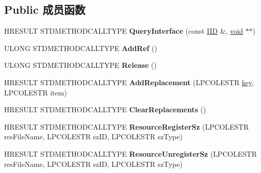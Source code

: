 \subsection*{Public 成员函数}
\begin{DoxyCompactItemize}
\item 
\mbox{\label{class_a_t_l_1_1_c_reg_object_a1d49348a30bd36a8d9355868ca99c03a}} 
H\+R\+E\+S\+U\+LT S\+T\+D\+M\+E\+T\+H\+O\+D\+C\+A\+L\+L\+T\+Y\+PE {\bfseries Query\+Interface} (const \hyperlink{struct___i_i_d}{I\+ID} \&, \hyperlink{interfacevoid}{void} $\ast$$\ast$)
\item 
\mbox{\label{class_a_t_l_1_1_c_reg_object_a1987d123437b59e899ce6d49d314a3f4}} 
U\+L\+O\+NG S\+T\+D\+M\+E\+T\+H\+O\+D\+C\+A\+L\+L\+T\+Y\+PE {\bfseries Add\+Ref} ()
\item 
\mbox{\label{class_a_t_l_1_1_c_reg_object_a2bf200673a18a310ded97775d9581ffc}} 
U\+L\+O\+NG S\+T\+D\+M\+E\+T\+H\+O\+D\+C\+A\+L\+L\+T\+Y\+PE {\bfseries Release} ()
\item 
\mbox{\label{class_a_t_l_1_1_c_reg_object_ac03e892828542f7b43ee43185cf55474}} 
H\+R\+E\+S\+U\+LT S\+T\+D\+M\+E\+T\+H\+O\+D\+C\+A\+L\+L\+T\+Y\+PE {\bfseries Add\+Replacement} (L\+P\+C\+O\+L\+E\+S\+TR \hyperlink{structkey}{key}, L\+P\+C\+O\+L\+E\+S\+TR item)
\item 
\mbox{\label{class_a_t_l_1_1_c_reg_object_ab5c4b6fa8acf94ae0f697de88a597056}} 
H\+R\+E\+S\+U\+LT S\+T\+D\+M\+E\+T\+H\+O\+D\+C\+A\+L\+L\+T\+Y\+PE {\bfseries Clear\+Replacements} ()
\item 
\mbox{\label{class_a_t_l_1_1_c_reg_object_a1a053e996dbfd3f33376aece08ec5779}} 
H\+R\+E\+S\+U\+LT S\+T\+D\+M\+E\+T\+H\+O\+D\+C\+A\+L\+L\+T\+Y\+PE {\bfseries Resource\+Register\+Sz} (L\+P\+C\+O\+L\+E\+S\+TR res\+File\+Name, L\+P\+C\+O\+L\+E\+S\+TR sz\+ID, L\+P\+C\+O\+L\+E\+S\+TR sz\+Type)
\item 
\mbox{\label{class_a_t_l_1_1_c_reg_object_a02fa1e2167e7f4caa74235293e027d56}} 
H\+R\+E\+S\+U\+LT S\+T\+D\+M\+E\+T\+H\+O\+D\+C\+A\+L\+L\+T\+Y\+PE {\bfseries Resource\+Unregister\+Sz} (L\+P\+C\+O\+L\+E\+S\+TR res\+File\+Name, L\+P\+C\+O\+L\+E\+S\+TR sz\+ID, L\+P\+C\+O\+L\+E\+S\+TR sz\+Type)
$$
\end{DoxyCompactItemize}
